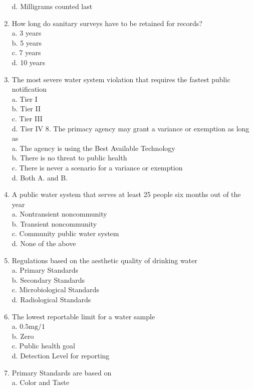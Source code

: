 \begin{enumerate}
d. Milligrams counted last\\
\item How long do sanitary surveys have to be retained for records?\\
a. 3 years\\
b. 5 years\\
c. 7 years\\
d. 10 years\\
\item The most severe water system violation that requires the fastest public notification\\
a. Tier I\\
b. Tier II\\
c. Tier III\\
d. Tier IV 8. The primacy agency may grant a variance or exemption as long as\\
a. The agency is using the Best Available Technology\\
b. There is no threat to public health\\
c. There is never a scenario for a variance or exemption\\
d. Both A. and B.\\
\item A public water system that serves at least 25 people six months out of the year\\
a. Nontransient noncommunity\\
b. Transient noncommunity\\
c. Community public water system\\
d. None of the above\\
\item Regulations based on the aesthetic quality of drinking water\\
a. Primary Standards\\
b. Secondary Standards\\
c. Microbiological Standards\\
d. Radiological Standards\\
\item The lowest reportable limit for a water sample\\
a. $0.5 \mathrm{mg} / 1$\\
b. Zero\\
c. Public health goal\\
d. Detection Level for reporting\\
\item Primary Standards are based on\\
a. Color and Taste\\

\end{enumerate}
